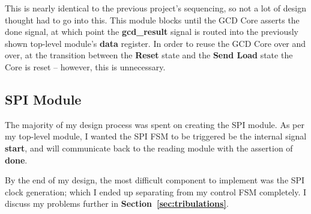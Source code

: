 \documentclass[a4paper, 12pt]{article}
\begin{document}
This is nearly identical to the previous project's sequencing, so not a lot of design thought had to go into this. This module blocks until the GCD Core asserts the done signal, at which point the \textbf{gcd\_result} signal is routed into the previously shown top-level module's \textbf{data} register. In order to reuse the GCD Core over and over, at the transition between the \textbf{Reset} state and the \textbf{Send Load} state the Core is reset -- however, this is unnecessary.

\subsection{SPI Module}
The majority of my design process was spent on creating the SPI module. As per my top-level module, I wanted the SPI FSM to be triggered be the internal signal \textbf{start}, and will communicate back to the reading module with the assertion of \textbf{done}.

By the end of my design, the most difficult component to implement was the SPI clock generation; which I ended up separating from my control FSM completely. I discuss my problems further in \textbf{Section~\ref{sec:tribulations}}.
\end{document}
